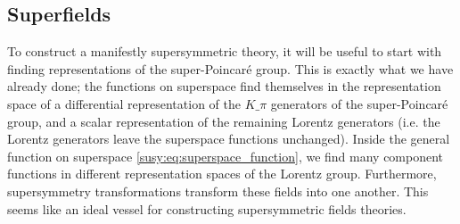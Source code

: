 \documentclass[../main.tex]{subfiles}
\begin{document}


\subsection{Superfields}
To construct a manifestly supersymmetric theory, it will be useful to start with finding representations of the super-Poincaré group.
This is exactly what we have already done; the functions on superspace find themselves in the representation space of a differential representation of the \(K\_\pi\) generators of the super-Poincaré group, and a scalar representation of the remaining Lorentz generators (i.e. the Lorentz generators leave the superspace functions unchanged).
Inside the general function on superspace \cref{susy:eq:superspace_function}, we find many component functions in different representation spaces of the Lorentz group.
Furthermore, supersymmetry transformations transform these fields into one another.
This seems like an ideal vessel for constructing supersymmetric fields theories.
\end{document}
